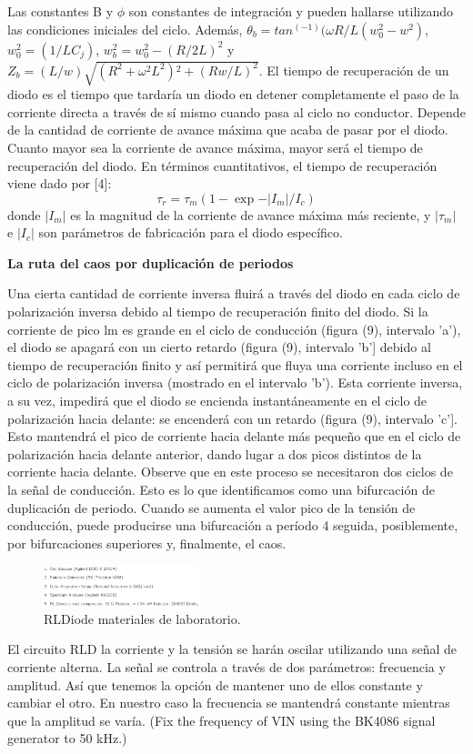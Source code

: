 \documentclass[%
 reprint,
 amsmath,amssymb,
 aps,
]{revtex4-2}
\begin{document}
Las constantes B y $\phi$ son constantes de integración y pueden hallarse utilizando las condiciones iniciales del ciclo. Además, $\theta_b = tan^(-1)⁡(ωR/L(w_{0}^{2}-w^{2})$, $w_{0}^{2}=(1/LC_j)$, $w_{b}^{2} = w_{0}^{2}-(R/2L)^2$ y $Z_{b}=(L/w)\sqrt{(R^{2}+ω^{2}L^{2}){^2}+(Rw/L)^2}$.
El tiempo de recuperación de un diodo es el tiempo que tardaría un diodo en detener completamente el paso de la corriente directa a través de sí mismo cuando pasa al ciclo no conductor. Depende de la cantidad de corriente de avance máxima que acaba de pasar por el diodo. Cuanto mayor sea la corriente de avance máxima, mayor será el tiempo de recuperación del diodo. En términos cuantitativos, el tiempo de recuperación viene dado por [4]:
\begin{equation}
    \tau_r = \tau_{m}(1-\exp{-|I_m|/I_c})
\end{equation}
donde $|I_m|$ es la magnitud de la corriente de avance máxima más reciente, y $|τ_m|$ e $|I_c|$ son parámetros de fabricación para el diodo específico.

\textbf{La ruta del caos por duplicación de periodos}

Una cierta cantidad de corriente inversa fluirá a través del diodo en cada ciclo de polarización inversa debido al tiempo de recuperación finito del diodo. Si la corriente de pico lm es grande en el ciclo de conducción (figura (9), intervalo 'a'), el diodo se apagará con un cierto retardo (figura (9), intervalo 'b'] debido al tiempo de recuperación finito y así permitirá que fluya una corriente incluso en el ciclo de polarización inversa (mostrado en el intervalo 'b'). Esta corriente inversa, a su vez, impedirá que el diodo se encienda instantáneamente en el ciclo de polarización hacia delante: se encenderá con un retardo (figura (9), intervalo 'c']. Esto mantendrá el pico de corriente hacia delante más pequeño que en el ciclo de polarización hacia delante anterior, dando lugar a dos picos distintos de la corriente hacia delante. Observe que en este proceso se necesitaron dos ciclos de la señal de conducción. Esto es lo que identificamos como una bifurcación de duplicación de periodo. Cuando se aumenta el valor pico de la tensión de conducción, puede producirse una bifurcación a período 4 seguida, posiblemente, por bifurcaciones superiores y, finalmente, el caos.
\begin{figure}
    \centering
    \includegraphics[width=0.4\textwidth]{RLDiodo/fig rldiode materiales.png}
    \caption{RLDiode materiales de laboratorio.}
    \label{fig:RLDiode materiales}
\end{figure}
El circuito RLD la corriente y la tensión se harán oscilar utilizando una señal de corriente alterna. La señal se controla a través de dos parámetros: frecuencia y amplitud. Así que tenemos la opción de mantener uno de ellos constante y cambiar el otro. En nuestro caso la frecuencia se mantendrá constante mientras que la amplitud se varía. (Fix the frequency of VIN using the BK4086 signal generator to 50 kHz.)
\end{document}
